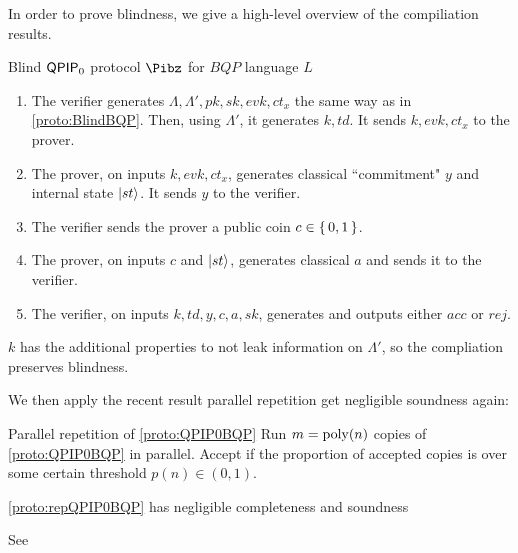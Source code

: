 In order to prove blindness, we give a high-level overview of the compiliation results.

\begin{protocol}{Blind $\operatorname{\mathsf{QPIP}}_0$ protocol $\Pibz$ for $BQP$ language $L$}
	\label{proto:QPIP0BQP}
	\begin{enumerate}
		\item The verifier generates $\Lambda, \Lambda', pk, sk, evk, ct_x$ the same way as in \cref{proto:BlindBQP}. 
			Then, using $\Lambda'$, it generates $k, td$.
			It sends $k, evk, ct_x$ to the prover.
		\item The prover, on inputs $k, evk, ct_x$, generates classical ``commitment" $y$ and internal state $\ket{st}$.
			It sends $y$ to the verifier.
		\item The verifier sends the prover a public coin $c\in\set{0,1}$.
		\item The prover, on inputs $c$ and $\ket{st}$, generates classical $a$ and sends it to the verifier.
		\item The verifier, on inputs $k, td, y, c, a, sk$, generates and outputs either $acc$ or $rej$.
	\end{enumerate}
\end{protocol}


$k$ has the additional properties to not leak information on $\Lambda'$, so the compliation preserves blindness. 

We then apply the recent result parallel repetition get negligible soundness again:

\begin{protocol}{Parallel repetition of \cref{proto:QPIP0BQP}}
	\label{proto:repQPIP0BQP}
	Run $m=\operatorname*{\operatorname{poly}}(n)$ copies of \cref{proto:QPIP0BQP} in parallel. Accept if the proportion of accepted copies is over some certain threshold $p(n)\in(0, 1)$.

\end{protocol}

\begin{thm}
	\cref{proto:repQPIP0BQP} has negligible completeness and soundness
\end{thm}
\begin{prf}
	See \cite{parallelrep, alagic2019twomessage}
\end{prf}

